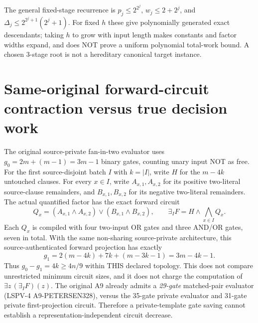 \documentclass[11pt]{article}
\begin{document}
\noindent The general fixed-stage recurrence is $p_j\le2^{2^j}$, $w_j\le2+2^j$, and $\Delta_j\le2^{2^j+1}(2^j+1)$. For fixed $h$ these give polynomially generated exact descendants; taking $h$ to grow with input length makes constants and factor widths expand, and does NOT prove a uniform polynomial total-work bound. A chosen $3$-stage root is not a hereditary canonical target instance.

\section{Same-original forward-circuit contraction versus true decision work}
The original source-private fan-in-two evaluator uses $g_0=2m+(m-1)=3m-1$ binary gates, counting unary input NOT as free. For the first source-disjoint batch $I$ with $k=|I|$, write $H$ for the $m-4k$ untouched clauses. For every $x\in I$, write $A_{x,1},A_{x,2}$ for its positive two-literal source-clause remainders, and $B_{x,1},B_{x,2}$ for its negative two-literal remainders. The actual quantified factor has the exact forward circuit
\[
 Q_x=(A_{x,1}\land A_{x,2})\lor(B_{x,1}\land B_{x,2}),\qquad
 \exists_I F=H\land\bigwedge_{x\in I}Q_x.
\]
Each $Q_x$ is compiled with four two-input OR gates and three AND/OR gates, seven in total. With the same non-sharing source-private architecture, this source-authenticated forward projection has exactly
\[
 g_1=2(m-4k)+7k+(m-3k-1)=3m-4k-1.
\]
Thus $g_0-g_1=4k\ge4n/9$ within THIS declared topology. This does not compare unrestricted minimum circuit sizes, and it does not charge the computation of $\exists z\,(\exists_I F)(z)$. The original A9 already admits a \emph{29-gate} matched-pair evaluator (LSPV-4 A9-PETERSEN328), versus the 35-gate private evaluator and 31-gate private first-projection circuit. Therefore a private-template gate saving cannot establish a representation-independent circuit decrease.
\end{document}
